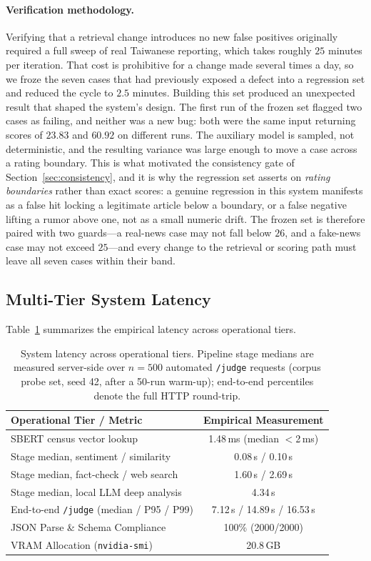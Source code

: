 \documentclass[twoside]{llncs}
\begin{document}
\paragraph{Verification methodology.}
Verifying that a retrieval change introduces no new false positives originally required a full sweep of real Taiwanese reporting, which takes roughly $25$ minutes per iteration. That cost is prohibitive for a change made several times a day, so we froze the seven cases that had previously exposed a defect into a regression set and reduced the cycle to $2.5$ minutes. Building this set produced an unexpected result that shaped the system's design. The first run of the frozen set flagged two cases as failing, and neither was a new bug: both were the same input returning scores of $23.83$ and $60.92$ on different runs. The auxiliary model is sampled, not deterministic, and the resulting variance was large enough to move a case across a rating boundary. This is what motivated the consistency gate of Section~\ref{sec:consistency}, and it is why the regression set asserts on \emph{rating boundaries} rather than exact scores: a genuine regression in this system manifests as a false hit locking a legitimate article below a boundary, or a false negative lifting a rumor above one, not as a small numeric drift. The frozen set is therefore paired with two guards---a real-news case may not fall below $26$, and a fake-news case may not exceed $25$---and every change to the retrieval or scoring path must leave all seven cases within their band.

\subsection{Multi-Tier System Latency}
Table~\ref{tab:latency} summarizes the empirical latency across operational tiers.

\begin{table}[!htbp]
\caption{System latency across operational tiers. Pipeline stage medians are measured server-side over $n=500$ automated \texttt{/judge} requests (corpus probe set, seed 42, after a 50-run warm-up); end-to-end percentiles denote the full HTTP round-trip.}
\label{tab:latency}
\centering
\begin{tabular}{lc}
\toprule
\textbf{Operational Tier / Metric} & \textbf{Empirical Measurement} \\
\midrule
SBERT census vector lookup & 1.48\,ms (median $<$2\,ms) \\
Stage median, sentiment / similarity & 0.08\,s / 0.10\,s \\
Stage median, fact-check / web search & 1.60\,s / 2.69\,s \\
Stage median, local LLM deep analysis & 4.34\,s \\
End-to-end \texttt{/judge} (median / P95 / P99) & 7.12\,s / 14.89\,s / 16.53\,s \\
JSON Parse \& Schema Compliance & 100\% (2000/2000) \\
VRAM Allocation (\texttt{nvidia-smi}) & 20.8\,GB \\
\bottomrule
\end{tabular}
\end{table}
\end{document}
